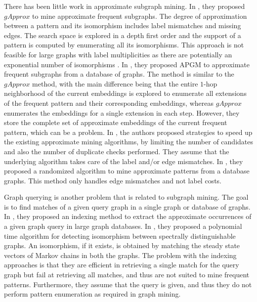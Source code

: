 There has been little work in approximate subgraph mining.  In
\cite{gapprox}, they proposed $gApprox$ to mine approximate frequent
subgraphs.  The degree of approximation between a pattern and its
isomorphism includes label mismatches and missing edges. The search
space is explored in a depth first order and the support of a pattern is
computed by enumerating all its isomorphisms. This approach is not
feasible for large graphs with label multiplicities as there are
potentially an exponential number of isomorphisms \cite{2012-kais}.  In
\cite{JiaZH11}, they proposed APGM to approximate frequent subgraphs
from a database of graphs. The method is similar to the $gApprox$
method, with the main difference being that 
 the entire $1$-hop neighborhood of the current embeddings
is explored to enumerate all extensions of the frequent pattern and
their corresponding embeddings, whereas $gApprox$ enumerates the
embeddings for a single extension in each step.  
However, they store the complete set of approximate embeddings of the
current frequent pattern, which can be a problem. 
In \cite{SpeedUpFAS},
the authors proposed strategies to speed up the existing approximate
mining algorithms, by limiting the number of candidates and also the
number of duplicate checks performed. They assume that the underlying
algorithm takes care of the label and/or edge mismatches.  In
\cite{RAM2008}, they proposed a randomized algorithm to mine approximate
patterns from a database graphs. This method only handles edge
mismatches and not label costs.

Graph querying is another problem that is related to
subgraph mining. The goal is to find matches of a given query graph in a
single graph or database of graphs.  In \cite{TALE}, they proposed an
indexing method to extract the approximate occurrences of a given graph
query in large graph databases.  
In \cite{RandomMatching}, they proposed a polynomial
time algorithm for detecting isomorphism between spectrally
distinguishable graphs. An isomorphism, if it exists, 
is obtained by matching
the steady state vectors of Markov chains in both the graphs.  
The problem with the indexing approaches is that
they are efficient in retrieving a single match for the query graph but
fail at retrieving all matches, and thus are not suited to mine frequent
patterns. Furthermore, they assume that the query is given, and thus they
do not perform pattern enumeration as required in graph mining.

